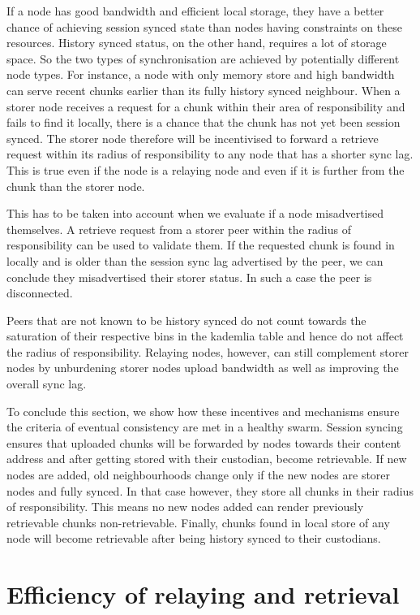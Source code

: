 If a node has good bandwidth and efficient local storage, they have a better chance of achieving session synced state than nodes having constraints on these resources. History synced status, on the other hand, requires a lot of storage space. So the two types of synchronisation are achieved by potentially different node types. For instance, a node with only memory store and high bandwidth can serve recent chunks earlier than its  fully history synced neighbour. When a storer node receives a request for a chunk within their area of responsibility and fails to find it locally, there is a chance that the chunk has not yet been session synced. The storer node therefore will be incentivised to forward a retrieve request within its radius of responsibility to any node that has a shorter sync lag. This is true even if the node is a relaying node and even if it is further from the chunk than the storer node. 

This has to be taken into account when we evaluate if a node misadvertised themselves. A retrieve request from a storer peer within the radius of responsibility can be used to validate them. If the requested chunk is found in locally and is older than the  session sync lag advertised by the peer, we can conclude they misadvertised their storer status. In such a case the peer is disconnected. 


Peers that are not known to be history synced do not count towards the saturation of their respective bins in the kademlia table and hence do not affect the radius of responsibility. Relaying nodes, however, can still complement storer nodes by unburdening storer nodes upload bandwidth as well as improving the overall sync lag.

To conclude this section, we show how these incentives and mechanisms ensure the criteria of eventual consistency are met in a healthy swarm. 
Session syncing ensures that uploaded chunks will be forwarded by nodes towards their content address and after getting stored with their custodian, become retrievable. If new nodes are added, old neighbourhoods change only if the new nodes are storer nodes and fully synced. In that case however, they store all chunks in their radius of responsibility. This means no new nodes added can render previously retrievable chunks non-retrievable. 
Finally, chunks found in local store of any node will become retrievable after being history synced to their custodians. 

\section{Efficiency of relaying and retrieval}
\label{sec:efficiency}

